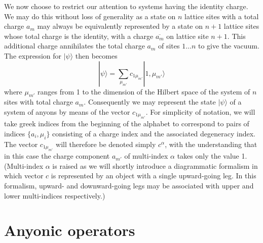 \documentclass[aps,prb,reprint,superscriptaddress,amsfonts,amsmath,amssymb,showpacs,floatfix]{revtex4-1}
\newcommand{\ra}{\rangle}
\begin{document}
We now choose to restrict our attention to systems having the identity charge. We may do this without loss of generality as a state on $n$ lattice sites with a total charge $a_{m}$ may always be equivalently represented by a state on $n+1$ lattice sites whose total charge is the identity, with a charge $\overline{a_{m}}$ on lattice site $n+1$. This additional charge annihilates the total charge $a_{m}$ of sites $1\ldots n$ to give the vacuum. The expression for $|\psi\ra$ then becomes
\begin{equation}
|\psi\ra = \sum_{\mu_{m'}} c_{1\mu_{m'}} |1,\mu_{m'}\ra\label{eq:statepsi}
\end{equation}
where $\mu_{m'}$ ranges from 1 to the dimension of the Hilbert space of the system of $n$ sites with total charge $a_m$.
Consequently we may represent the state $|\psi\ra$ of a system of anyons by means of the vector $c_{1\mu_{m'}}$. For simplicity of notation, we will take greek indices from the beginning of the alphabet to correspond to pairs of indices $\{a_i,\mu_i\}$ consisting of a charge index and the associated degeneracy index. The vector $c_{1\mu_{m'}}$ will therefore be denoted simply $c^\alpha$, with the understanding that in this case 
the charge component $a_{m'}$ of multi-index $\alpha$ takes 
only
the value 1. (Multi-index $\alpha$ is raised as we will shortly introduce a diagrammatic formalism in which vector $c$ is represented by an object with a single upward-going leg. In this formalism, upward- and downward-going legs may be associated with upper and lower multi-indices respectively.)



\section{Anyonic operators}
\end{document}
